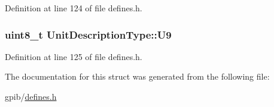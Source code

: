 Definition at line 124 of file defines.\+h.

\subsubsection[{\texorpdfstring{U9}{U9}}]{\setlength{\rightskip}{0pt plus 5cm}uint8\+\_\+t Unit\+Description\+Type\+::\+U9}\hypertarget{structUnitDescriptionType_a23817cabba1909bcf5a0732ed5da1351}{}\label{structUnitDescriptionType_a23817cabba1909bcf5a0732ed5da1351}


Definition at line 125 of file defines.\+h.



The documentation for this struct was generated from the following file\+:\begin{DoxyCompactItemize}
\item 
gpib/\hyperlink{defines_8h}{defines.\+h}\end{DoxyCompactItemize}
